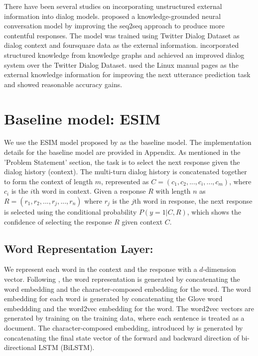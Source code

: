 \documentclass[letterpaper]{article} %
\begin{document}
There have been several studies on incorporating unstructured external information into dialog models. \citeauthor{ghazvininejad2017knowledge}  proposed a knowledge-grounded neural conversation model by improving the seq2seq approach to produce more contentful responses. The model was trained using Twitter Dialog Dataset \cite{li2016diversity} as dialog context and foursquare data as the external information. \citeauthor{young2017augmenting}  incorporated structured knowledge from knowledge graphs and achieved an improved dialog system over the Twitter Dialog Dataset.  \citeauthor{lowe2015incorporating}  used the Linux manual pages as the external knowledge information for improving the next utterance prediction task and showed reasonable accuracy gains.


\section{Baseline model: ESIM}
\label{baseline-model-esim}

We use the ESIM model proposed by \citeauthor{chen2017enhanced}  as the baseline model. The implementation details for the baseline model are provided in Appendix. As mentioned in the 'Problem Statement' section, the task is to select the next response given the dialog history (context). The multi-turn dialog history is concatenated together to form the context of length $m$, represented as $C = (c_1, c_2, ..., c_i, ..., c_m)$, where $c_i$ is the $i$th word in context. Given a response $R$ with length $n$ as $R = (r_1, r_2, ..., r_j, ..., r_n)$ where $r_j$ is the $j$th word in response, the next response is 
selected using the conditional probability $P(y=1|C,R)$, which shows the confidence of selecting the response $R$ given context $C$. 

\subsection{Word Representation Layer:}
We represent each word in the context and the response with a $d$-dimension vector. Following \citeauthor{dong2018enhance} , the word representation is generated by concatenating the word embedding and the character-composed embedding for the word.  The word embedding for each word is generated by concatenating the Glove word embeddding \cite{pennington2014glove} and the word2vec embedding \cite{mikolov2013efficient} for the word. The word2vec vectors are generated by training on the training data, where each sentence is treated as a document. The character-composed embedding, introduced by \cite{dong2018enhance} is generated by concatenating the final state vector of the forward and backward direction of bi-directional LSTM (BiLSTM).
\end{document}
